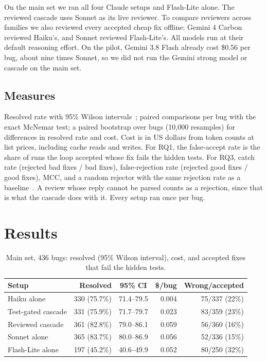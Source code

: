 \documentclass[10pt,conference]{IEEEtran}
\begin{document}
\smallskip\noindent On the main set we ran all four Claude setups and Flash-Lite alone. The reviewed cascade uses
Sonnet as its live reviewer. To compare reviewers across families we also reviewed every accepted cheap fix offline:
Gemini 4 Carbon reviewed Haiku's, and Sonnet reviewed Flash-Lite's. All models run at their default reasoning effort.
On the pilot, Gemini 3.8 Flash already cost \$0.56 per bug, about nine times Sonnet, so we did not run the Gemini
strong model or cascade on the main set.

\subsection{Measures}
Resolved rate with 95\% Wilson intervals~\cite{bowyer2025}; paired comparisons per bug with the exact McNemar test;
a paired bootstrap over bugs (10{,}000 resamples) for differences in resolved rate and cost. Cost is in US dollars
from token counts at list prices, including cache reads and writes. For RQ1, the false-accept rate is the share of runs
the loop accepted whose fix fails the hidden tests. For RQ3, catch rate (rejected bad fixes / bad fixes),
false-rejection rate (rejected good fixes / good fixes), MCC, and a random rejector with the same rejection rate as a
baseline~\cite{williams2026}. A review whose reply cannot be parsed counts as a rejection, since that is what the
cascade does with it. Every setup ran once per bug.

\section{Results}

\begin{table}[t]
\caption{Main set, 436 bugs: resolved (95\% Wilson interval), cost, and accepted fixes that fail the hidden tests.}
\label{tab:main}
\centering
\setlength{\tabcolsep}{2.5pt}
\begin{tabular}{@{}lrcrr@{}}
\toprule
Setup & Resolved & 95\% CI & \$/bug & Wrong/accepted \\
\midrule
Haiku alone & 330 (75.7\%) & 71.4--79.5 & 0.004 & 75/337 (22\%) \\
Test-gated cascade & 331 (75.9\%) & 71.7--79.7 & 0.023 & 83/359 (23\%) \\
Reviewed cascade & 361 (82.8\%) & 79.0--86.1 & 0.059 & 56/360 (16\%) \\
Sonnet alone & 365 (83.7\%) & 80.0--86.9 & 0.056 & 52/336 (15\%) \\
\midrule
Flash-Lite alone & 197 (45.2\%) & 40.6--49.9 & 0.052 & 80/250 (32\%) \\
\bottomrule
\end{tabular}
\end{table}
\end{document}
